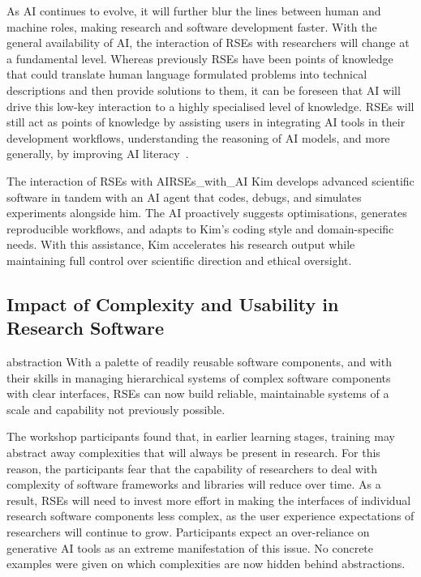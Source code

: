 \documentclass{eceasst}
\begin{document}
As AI continues to evolve, it will further blur the lines between human and machine roles, making research and software development faster.
With the general availability of AI, the interaction of RSEs with researchers will change at a fundamental level.
Whereas previously RSEs have been points of knowledge that could translate
human language formulated problems into technical descriptions and then provide solutions to them,
it can be foreseen that AI will drive this low-key interaction to a highly specialised level of knowledge.
RSEs will still act as points of knowledge by assisting users in integrating
AI tools in their development workflows, understanding the reasoning of AI models,
and more generally, by improving AI literacy~\cite{Alenezi2025}.

\begin{story}{The interaction of RSEs with AI}{RSEs_with_AI}
Kim develops advanced scientific software in tandem with an AI agent that codes,
debugs, and simulates experiments alongside him. The AI proactively suggests optimisations,
generates reproducible workflows, and adapts to Kim’s coding style and domain-specific needs.
With this assistance, Kim accelerates his research output while maintaining full control over scientific direction and ethical oversight.
\end{story}

\subsection{Impact of Complexity and Usability in Research Software}
\label{sec:complexity}
\begin{whatis}{}{abstraction}
With a palette of readily reusable software components,
and with their skills in managing hierarchical systems of complex software components with clear interfaces,
RSEs can now build reliable, maintainable systems of a scale and capability not previously possible.
\end{whatis}

The workshop participants found that, in earlier learning stages,
training may abstract away complexities that will always be present in research.
For this reason, the participants fear that the capability of researchers to deal with complexity
of software frameworks and libraries will reduce over time.
As a result, RSEs will need to invest more effort in making the interfaces of individual research software components
less complex, as the user experience expectations of researchers will continue to grow.
Participants expect an over-reliance on generative AI tools as an extreme manifestation of this issue.
No concrete examples were given on which complexities are now hidden behind abstractions.
\end{document}
